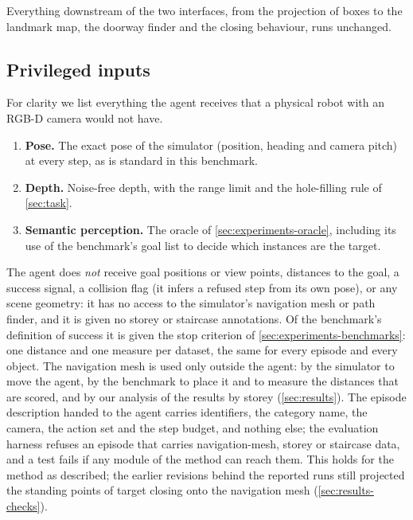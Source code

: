 \documentclass[10pt]{article}
\begin{document}
Everything downstream of the two interfaces, from the projection of boxes to
the landmark map, the doorway finder and the closing behaviour, runs
unchanged.

\subsection{Privileged inputs}\label{sec:experiments-privileges}
For clarity we list everything the agent receives that a physical robot with
an RGB-D camera would not have.
\begin{enumerate}[leftmargin=*,itemsep=2pt,topsep=2pt]
  \item \textbf{Pose.} The exact pose of the simulator (position, heading and
        camera pitch) at every step, as is standard in this benchmark.
  \item \textbf{Depth.} Noise-free depth, with the range limit and the
        hole-filling rule of \cref{sec:task}.
  \item \textbf{Semantic perception.} The oracle of
        \cref{sec:experiments-oracle}, including its use of the benchmark's
        goal list to decide which instances are the target.
\end{enumerate}
The agent does \emph{not} receive goal positions or view points, distances to
the goal, a success signal, a collision flag (it infers a refused step from
its own pose), or any scene geometry: it has no access to the simulator's
navigation mesh or path finder, and it is given no storey or staircase
annotations. Of the benchmark's definition of success it is given the stop
criterion of \cref{sec:experiments-benchmarks}: one distance and one measure
per dataset, the same for every episode and every object. The navigation mesh is used only outside the agent: by the
simulator to move the agent, by the benchmark to place it and to measure the
distances that are scored, and by our analysis of the results by storey
(\cref{sec:results}). The episode description handed to the agent carries
identifiers, the category name, the camera, the action set and the step
budget, and nothing else; the evaluation harness refuses an episode that
carries navigation-mesh, storey or staircase data, and a test fails if any
module of the method can reach them.
This holds for the method as described; the earlier revisions behind the
reported runs still projected the standing points of target closing onto the
navigation mesh (\cref{sec:results-checks}).
\end{document}

